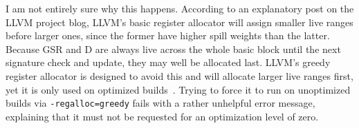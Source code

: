 I am not entirely sure why this happens. According to an explanatory post on
the LLVM project blog, LLVM's basic register allocator will assign smaller live
ranges before larger ones, since the former have higher spill weights than the
latter. Because GSR and D are always live across the whole basic block until
the next signature check and update, they may well be allocated last. LLVM's
greedy register allocator is designed to avoid this and will allocate larger
live ranges first, yet it is only used on optimized
builds~\cite{llvm-register-allocation}. Trying to force it to run on
unoptimized builds via \texttt{-regalloc=greedy} fails
with a rather unhelpful error message, explaining that it must not be requested
for an optimization level of zero.

